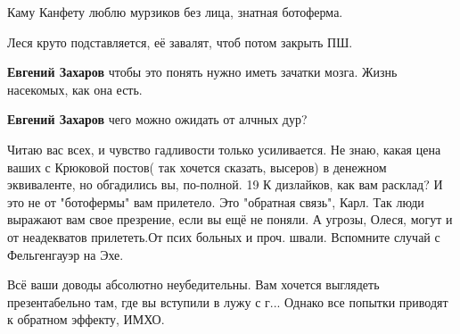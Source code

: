 \begin{itemize}
\begin{itemize}
Каму Канфету люблю мурзиков без лица, знатная ботоферма.
\end{itemize}

 
Леся круто подставляется, её завалят, чтоб потом закрыть ПШ.

\begin{itemize}
 
\textbf{Евгений Захаров} чтобы это понять нужно иметь зачатки мозга. Жизнь насекомых, как она есть.

 
\textbf{Евгений Захаров} чего можно ожидать от алчных дур?
\end{itemize}

 

Читаю вас всех, и чувство гадливости только усиливается. Не знаю, какая цена
ваших с Крюковой постов( так хочется сказать, высеров) в денежном эквиваленте,
но обгадились вы, по-полной. 19 К дизлайков, как вам расклад? И это не от
"ботофермы" вам прилетело. Это "обратная связь", Карл. Так люди выражают вам
свое презрение, если вы ещё не поняли. А угрозы, Олеся, могут и от неадекватов
прилететь.От псих больных и проч. швали. Вспомните случай с Фельгенгауэр на
Эхе.

Всё ваши доводы абсолютно неубедительны. Вам хочется выглядеть презентабельно
там, где вы вступили в лужу с г... Однако все попытки приводят к обратном
эффекту, ИМХО.


 


\end{itemize}

